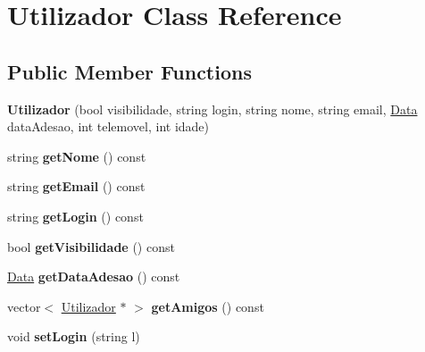 \hypertarget{class_utilizador}{}\section{Utilizador Class Reference}
\label{class_utilizador}
\subsection*{Public Member Functions}
\begin{DoxyCompactItemize}
\item 
\hypertarget{class_utilizador_a470435e7e91ef2aa93eaf97b0615499b}{}{\bfseries Utilizador} (bool visibilidade, string login, string nome, string email, \hyperlink{class_data}{Data} data\+Adesao, int telemovel, int idade)\label{class_utilizador_a470435e7e91ef2aa93eaf97b0615499b}

\item 
\hypertarget{class_utilizador_aa5af9c1385b0a93116dd8a80264b887a}{}string {\bfseries get\+Nome} () const \label{class_utilizador_aa5af9c1385b0a93116dd8a80264b887a}

\item 
\hypertarget{class_utilizador_a9fc99ac7634ff085ca0f3afd4d502cc7}{}string {\bfseries get\+Email} () const \label{class_utilizador_a9fc99ac7634ff085ca0f3afd4d502cc7}

\item 
\hypertarget{class_utilizador_ad6c565c391bd19de3462e50a4e05c9a6}{}string {\bfseries get\+Login} () const \label{class_utilizador_ad6c565c391bd19de3462e50a4e05c9a6}

\item 
\hypertarget{class_utilizador_a99cdee165a8446fb67f3e0cab0831e80}{}bool {\bfseries get\+Visibilidade} () const \label{class_utilizador_a99cdee165a8446fb67f3e0cab0831e80}

\item 
\hypertarget{class_utilizador_af6c41442d2029ccb1a135092a5c27007}{}\hyperlink{class_data}{Data} {\bfseries get\+Data\+Adesao} () const \label{class_utilizador_af6c41442d2029ccb1a135092a5c27007}

\item 
\hypertarget{class_utilizador_ad76009d2278707a5c9a1e8088633cfd2}{}vector$<$ \hyperlink{class_utilizador}{Utilizador} $\ast$ $>$ {\bfseries get\+Amigos} () const \label{class_utilizador_ad76009d2278707a5c9a1e8088633cfd2}

\item 
\hypertarget{class_utilizador_a11032f76b9d07c21e9111155519407c5}{}void {\bfseries set\+Login} (string l)\label{class_utilizador_a11032f76b9d07c21e9111155519407c5}


\end{DoxyCompactItemize}
